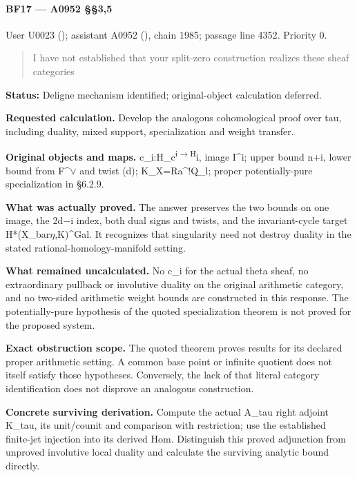 \paragraph{BF17 --- A0952 §§3,5}\label{bf17-a0952-35}

User U0023 (\protect{});
assistant A0952 (\protect{}),
chain 1985; passage line 4352. Priority 0.

\begin{quote}
I have not established that your split-zero construction realizes these
sheaf categories
\end{quote}

\textbf{Status:} Deligne mechanism identified; original-object
calculation deferred.

\textbf{Requested calculation.} Develop the analogous cohomological
proof over tau, including duality, mixed support, specialization and
weight transfer.

\textbf{Original objects and maps.}
c\_i:H\_c\textsuperscript{i\allowbreak{}\ensuremath{→}\allowbreak{}H}i,
image I\^{}i; upper bound n+i, lower bound from
F\textasciicircum{}\allowbreak{}\ensuremath{∨}\allowbreak{} and twist
(d); K\_X=Ra\^{}!Q\_l; proper potentially-pure specialization in §6.2.9.

\textbf{What was actually proved.} The answer preserves the two bounds
on one image, the 2d\allowbreak{}\ensuremath{−}\allowbreak{}i index,
both dual signs and twists, and the invariant-cycle target
H*(X\_bar\allowbreak{}\ensuremath{η}\allowbreak{},K)\textasciicircum{}Gal.
It recognizes that singularity need not destroy duality in the stated
rational-homology-manifold setting.

\textbf{What remained uncalculated.} No c\_i for the actual theta sheaf,
no extraordinary pullback or involutive duality on the original
arithmetic category, and no two-sided arithmetic weight bounds are
constructed in this response. The potentially-pure hypothesis of the
quoted specialization theorem is not proved for the proposed system.

\textbf{Exact obstruction scope.} The quoted theorem proves results for
its declared proper arithmetic setting. A common base point or infinite
quotient does not itself satisfy those hypotheses. Conversely, the lack
of that literal category identification does not disprove an analogous
construction.

\textbf{Concrete surviving derivation.} Compute the actual A\_tau right
adjoint K\_tau, its unit/counit and comparison with restriction; use the
established finite-jet injection into its derived Hom. Distinguish this
proved adjunction from unproved involutive local duality and calculate
the surviving analytic bound directly.

